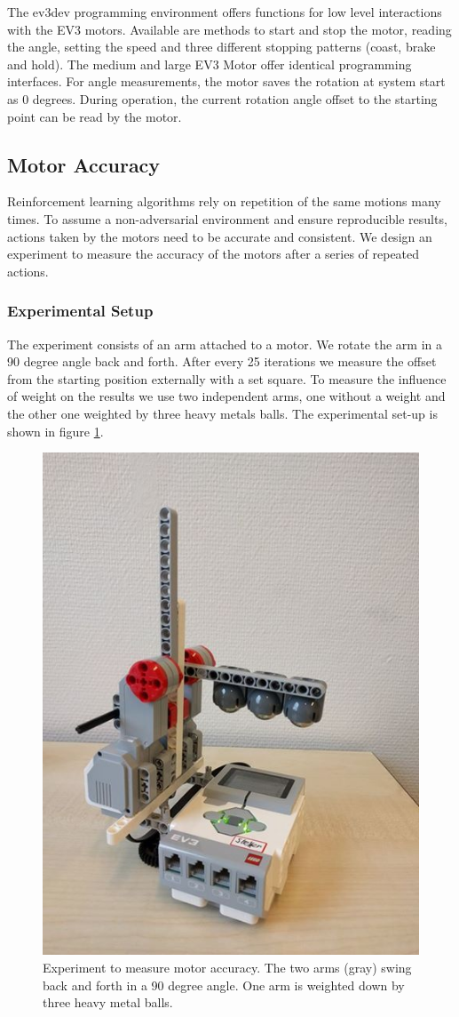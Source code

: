 \documentclass[11pt, a4paper]{article}
\begin{document}
The ev3dev programming environment offers functions for low level interactions with the EV3 motors. Available are methods to start and stop the motor, reading the angle, setting the speed and three different stopping patterns (coast, brake and hold). The medium and large EV3 Motor offer identical programming interfaces. For angle measurements, the motor saves the rotation at system start as 0 degrees. During operation, the current rotation angle offset to the starting point can be read by the motor. \cite{ev3_python}

\subsection*{Motor Accuracy}
Reinforcement learning algorithms rely on repetition of the same motions many times. To assume a non-adversarial environment and ensure reproducible results, actions taken by the motors need to be accurate and consistent. We design an experiment to measure the accuracy of the motors after a series of repeated actions.

\subsubsection*{Experimental Setup}
The experiment consists of an arm attached to a motor. We rotate the arm in a 90 degree angle back and forth. After every 25 iterations we measure the offset from the starting position externally with a set square. To measure the influence of weight on the results we use two independent arms, one without a weight and the other one weighted by three heavy metals balls. The experimental set-up is shown in figure \ref{fig:angle_experiment}.

\begin{figure}
\centering
\includegraphics[width=0.35\linewidth]{images/angle_experiment}
\caption{Experiment to measure motor accuracy. The two arms (gray) swing back and forth in a 90 degree angle. One arm is weighted down by three heavy metal balls.}
\label{fig:angle_experiment}
\end{figure}
\end{document}
